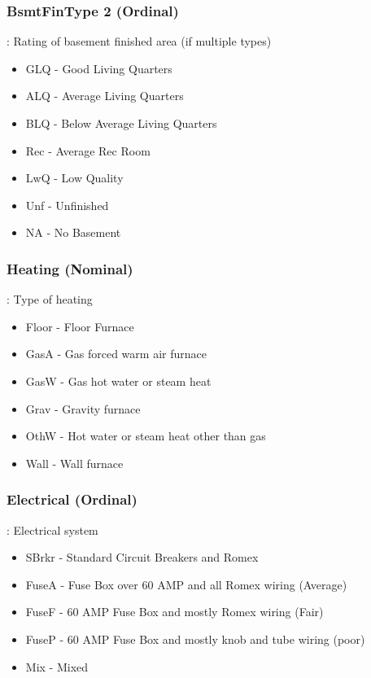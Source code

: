 \documentclass[sigconf]{acmart}
\begin{document}
	\subsubsection{BsmtFinType 2  (Ordinal)}: Rating of basement finished area (if multiple types)
	\begin{itemize}
		\item  GLQ - Good Living Quarters
		\item  ALQ - Average Living Quarters
		\item  BLQ - Below Average Living Quarters
		\item  Rec - Average Rec Room
		\item  LwQ - Low Quality
		\item  Unf - Unfinished
		\item  NA - No Basement
	\end{itemize}
	\subsubsection{Heating (Nominal)}: Type of heating
	\begin{itemize}
		\item  Floor - Floor Furnace
		\item  GasA - Gas forced warm air furnace
		\item  GasW - Gas hot water or steam heat
		\item  Grav - Gravity furnace
		\item  OthW - Hot water or steam heat other than gas
		\item  Wall - Wall furnace
	\end{itemize}
		
	\subsubsection{Electrical (Ordinal)}: Electrical system
	\begin{itemize}
		\item  SBrkr - Standard Circuit Breakers and Romex
		\item  FuseA - Fuse Box over 60 AMP and all Romex wiring (Average)
		\item  FuseF - 60 AMP Fuse Box and mostly Romex wiring (Fair)
		\item  FuseP - 60 AMP Fuse Box and mostly knob and tube wiring (poor)
		\item  Mix - Mixed
	\end{itemize}
	
	
	
\end{document}
